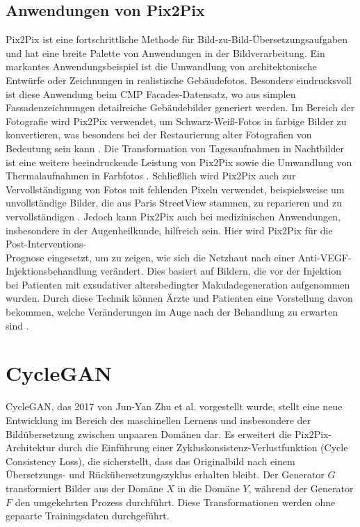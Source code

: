 \subsection{Anwendungen von Pix2Pix}
Pix2Pix ist eine fortschrittliche Methode für Bild-zu-Bild-Übersetzungsaufgaben und hat eine breite Palette von Anwendungen in der Bildverarbeitung.\newline
Ein markantes Anwendungsbeispiel ist die Umwandlung von architektonische Entwürfe oder Zeichnungen in realistische Gebäudefotos. Besonders eindrucksvoll ist diese Anwendung beim CMP Facades-Datensatz, wo aus simplen Fassadenzeichnungen detailreiche Gebäudebilder generiert werden. \cite{PhillipIsola.}
\newline
Im Bereich der Fotografie wird Pix2Pix verwendet, um Schwarz-Weiß-Fotos in farbige Bilder zu konvertieren, was besonders bei der Restaurierung alter Fotografien von Bedeutung sein kann \cite{PhillipIsola.}.
\newline
Die Transformation von Tagesaufnahmen in Nachtbilder ist eine weitere beeindruckende Leistung von Pix2Pix sowie die Umwandlung von Thermalaufnahmen in Farbfotos \cite{PhillipIsola.}.
\newline
Schließlich wird Pix2Pix auch zur Vervollständigung von Fotos mit fehlenden Pixeln verwendet, beispielsweise um unvollständige Bilder, die aus Paris StreetView stammen, zu reparieren und zu vervollständigen \cite{PhillipIsola.}.
\newline
Jedoch kann Pix2Pix auch bei medizinischen Anwendungen, insbesondere in der Augenheilkunde, hilfreich sein. Hier wird Pix2Pix für die Post-Interventions-\\Prognose eingesetzt, um zu zeigen, wie sich die Netzhaut nach einer Anti-VEGF-\\Injektionsbehandlung verändert. Dies basiert auf Bildern, die vor der Injektion bei Patienten mit exsudativer altersbedingter Makuladegeneration aufgenommen wurden. Durch diese Technik können Ärzte und Patienten eine Vorstellung davon bekommen, welche Veränderungen im Auge nach der Behandlung zu erwarten sind \cite{AramYouJinKukKimIkHeeRyuTaeKeunYoo.2022}.

\section{CycleGAN}
CycleGAN, das 2017 von Jun-Yan Zhu et al. vorgestellt wurde, stellt eine neue Entwicklung im Bereich des maschinellen Lernens und insbesondere der Bildübersetzung zwischen unpaaren Domänen dar. Es erweitert die Pix2Pix-Architektur durch die Einführung einer Zykluskonsistenz-Verlustfunktion (Cycle Consistency Loss), die sicherstellt, dass das Originalbild nach einem Übersetzungs- und Rückübersetzungszyklus erhalten bleibt. Der Generator $G$ transformiert Bilder aus der Domäne $X$ in die Domäne $Y$, während der Generator $F$ den umgekehrten Prozess durchführt. Diese Transformationen werden ohne gepaarte Trainingsdaten durchgeführt.

